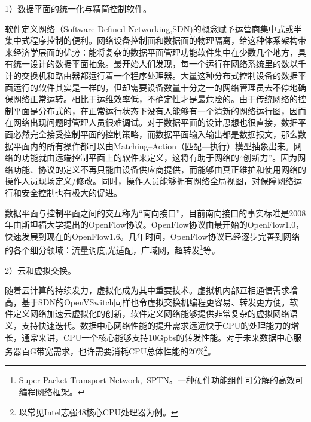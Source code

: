 

1）数据平面的统一化与精简控制软件。

软件定义网络（Software Defined Networking,SDN)的概念赋予运营商集中式或半集中式程序控制的便利。网络设备控制面和数据面的物理隔离，给这种体系架构带来经济学层面的优势：能将复杂的数据平面管理功能软件集中在少数几个地方，具有统一设计的数据平面抽象。最开始人们发现，每一个运行在网络系统里的数以千计的交换机和路由器都运行着一个程序处理器。大量这种分布式控制设备的数据平面运行的软件其实是一样的，但却需要设备数量十分之一的网络管理员去不停地确保网络正常运转。相比于运维效率低，不确定性才是最危险的。由于传统网络的控制平面是分布式的，在正常运行状态下没有人能够有一个清新的网络运行图，因而在网络出现问题时管理人员很难调试。对于数据平面的设计思想也很直接，数据平面必然完全接受控制平面的控制策略，而数据平面输入输出都是数据报文，那么数据平面内的所有操作都可以由Matching--Action（匹配---执行）模型抽象出来。网络的功能就由远端控制平面上的软件来定义，这将有助于网络的“创新力”。因为网络功能、协议的定义不再只能由设备供应商提供，而能够由真正维护和使用网络的操作人员现场定义/修改。同时，操作人员能够拥有网络全局视图，对保障网络运行和安全控制也有极大的促进。

数据平面与控制平面之间的交互称为“南向接口”，目前南向接口的事实标准是2008年由斯坦福大学提出的OpenFlow协议。OpenFlow协议由最开始的OpenFlow1.0，快速发展到现在的OpenFlow1.6。几年时间，OpenFlow协议已经逐步完善到网络的各个细分领域：流量调度,光适配，广域网，超转发\footnote{Super Packet Transport Network,~SPTN。一种硬件功能组件可分解的高效可编程网络框架。}等。

2）云和虚拟交换。

随着云计算的持续发力，虚拟化成为其中重要技术。虚拟机内部互相通信需求增高，基于SDN的OpenVSwitch同样也令虚拟交换机编程更容易、转发更方便。软件定义网络加速云虚拟化的创新，软件定义网络能够提供非常复杂的虚拟网络语义，支持快速迭代。数据中心网络性能的提升需求远远快于CPU的处理能力的增长，通常来讲，CPU一个核心能够支持10Gpbs的转发性能。对于未来数据中心服务器百G带宽需求，也许需要消耗CPU总体性能的20\%\footnote{以常见Intel志强48核心CPU处理器为例。}。



